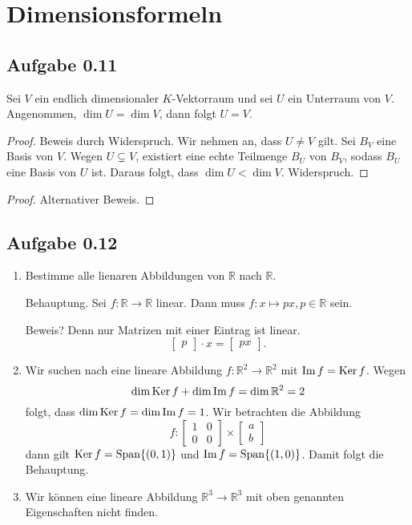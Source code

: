\section*{Dimensionsformeln}
\subsection*{Aufgabe 0.11}
\begin{Behauptung}
  Sei \(V\) ein endlich dimensionaler \(K\)-Vektorraum und sei \(U\)
  ein Unterraum von \(V\).  Angenommen, \(\dim U = \dim V\), dann
  folgt \(U = V\).
\end{Behauptung}
\begin{proof}
  Beweis durch Widerspruch.  Wir nehmen an, dass \(U \ne V\) gilt.  Sei
  \(B_{V}\) eine Basis von \(V\).  Wegen \(U \subsetneq V\), existiert eine echte
  Teilmenge \(B_{U}\) von \(B_{V}\), sodass \(B_{U}\) eine Basis von
  \(U\) ist.  Daraus folgt, dass \(\dim U < \dim V\).  Widerspruch.
\end{proof}
\begin{proof}
  Alternativer Beweis.
\end{proof}
\subsection*{Aufgabe 0.12}
\begin{enumerate}
\item Bestimme alle lienaren Abbildungen von \(\mathbb{R}\) nach \(\mathbb{R}\).

  Behauptung.  Sei \(f\colon \mathbb{R} \to \mathbb{R}\) linear.  Dann muss \(f\colon x \mapsto px, p \in
  \mathbb{R}\) sein.

  Beweis?  Denn nur Matrizen mit einer Eintrag ist linear.
  \[
    \begin{bmatrix}
      p
    \end{bmatrix}
    \cdot x =
    \begin{bmatrix}
      px
    \end{bmatrix}.
  \]
\item Wir suchen nach eine lineare Abbildung \(f\colon \mathbb{R}^{2} \to \mathbb{R}^{2}\) mit
  \(\operatorname{Im} f = \operatorname{Ker} f\).  Wegen \[\dim \operatorname{Ker} f + \dim \operatorname{Im} f = \dim
    \mathbb{R}^{2} = 2 \]
  folgt, dass \(\dim \operatorname{Ker} f = \dim \operatorname{Im} f = 1\).  Wir betrachten die
  Abbildung
  \[
    f\colon
    \begin{bmatrix}
      1 & 0 \\
      0 & 0
    \end{bmatrix}
    \times
    \begin{bmatrix}
      a \\ b
    \end{bmatrix}
  \]
  dann gilt \(\operatorname{Ker} f = \operatorname{Span}\{(0, 1)\}\) und \(\operatorname{Im} f = \operatorname{Span}\{(1,
  0)\}\).  Damit folgt die Behauptung.

\item Wir können eine lineare Abbildung \(\mathbb{R}^{3} \to \mathbb{R}^{3}\) mit oben
  genannten Eigenschaften nicht finden.
\end{enumerate}
